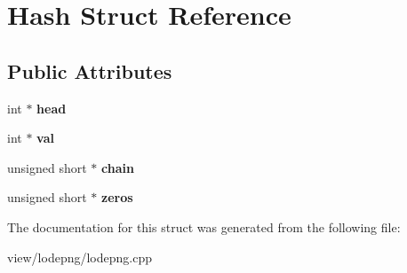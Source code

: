 \hypertarget{struct_hash}{\section{Hash Struct Reference}
\label{struct_hash}
}
\subsection*{Public Attributes}
\begin{DoxyCompactItemize}
\item 
\hypertarget{struct_hash_a0977cf12b1d8e6bbc784b5e0877926f5}{int $\ast$ {\bfseries head}}\label{struct_hash_a0977cf12b1d8e6bbc784b5e0877926f5}

\item 
\hypertarget{struct_hash_a66918968854722efdf7ab5f8ac2c6c1d}{int $\ast$ {\bfseries val}}\label{struct_hash_a66918968854722efdf7ab5f8ac2c6c1d}

\item 
\hypertarget{struct_hash_abf6ad3db2f652a19cc4ff0792e477899}{unsigned short $\ast$ {\bfseries chain}}\label{struct_hash_abf6ad3db2f652a19cc4ff0792e477899}

\item 
\hypertarget{struct_hash_a7247caa3e23eaba8f0d199ec5010c931}{unsigned short $\ast$ {\bfseries zeros}}\label{struct_hash_a7247caa3e23eaba8f0d199ec5010c931}

\end{DoxyCompactItemize}


The documentation for this struct was generated from the following file\-:\begin{DoxyCompactItemize}
\item 
view/lodepng/lodepng.\-cpp\end{DoxyCompactItemize}
